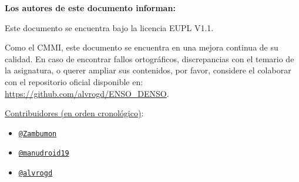 \vspace*{\fill}
\begin{center}
    \textbf{Los autores de este documento informan:}\\
\end{center}
\vspace*{0.6em}
\begin{center}
    Este documento se encuentra bajo la licencia EUPL V1.1.\\
\end{center}
\begin{center}
    Como el CMMI, este documento se encuentra en una mejora continua de su calidad. En caso de encontrar
    fallos ortográficos, discrepancias con el temario de la asignatura, o querer ampliar sus contenidos, por favor, considere el colaborar con el repositorio oficial disponible en:
    \url{https://github.com/alvrogd/ENSO_DENSO}.
\end{center}
\vspace*{0.6em}
\begin{center}
    \uline{Contribuidores (en orden cronológico)}:\\
    \begin{itemize}
        \item[] \hspace{2.33in}\href{https://github.com/Zambumon}{\texttt{@Zambumon}}
        \item[] \hspace{2.23in}\href{https://github.com/manudroid19}{\texttt{@manudroid19}}
        \item[] \hspace{2.385in}\href{https://github.com/alvrogd}{\texttt{@alvrogd}}
    \end{itemize}
\end{center}
\vspace*{\fill}